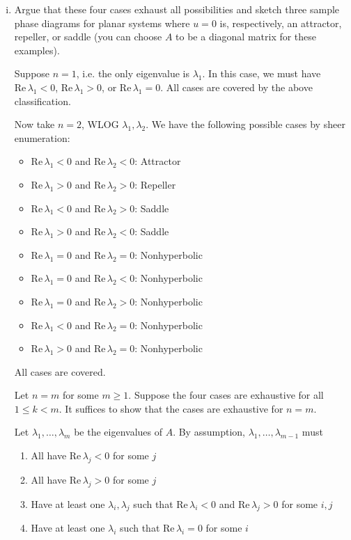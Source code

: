 \documentclass[12pt]{article}
\renewcommand{\Re}{\text{Re}\,}
\begin{document}
\begin{enumerate}[(i)]
    \item Argue that these four cases exhaust all possibilities and sketch three sample phase diagrams for planar systems where $u=0$ is, respectively, an attractor, repeller, or saddle (you can choose $A$ to be a diagonal matrix for these examples).

          \color{blue}
          Suppose $n =1$, i.e. the only eigenvalue is $\lambda_1$. In this case, we must have $\Re\lambda_1 < 0$, $\Re \lambda_1 > 0$, or $\Re \lambda_1 = 0$. All cases are covered by the above classification.

          Now take $n=2$, WLOG $\lambda_1, \lambda_2$. We have the following possible cases by sheer enumeration:
          \begin{itemize}
              \item $\Re \lambda_1 < 0$ and $\Re \lambda_2 < 0$: Attractor
              \item $\Re \lambda_1 > 0$ and $\Re \lambda_2 > 0$: Repeller
              \item $\Re \lambda_1 < 0$ and $\Re \lambda_2 > 0$: Saddle
              \item $\Re \lambda_1 > 0$ and $\Re \lambda_2 < 0$: Saddle
              \item $\Re \lambda_1 = 0$ and $\Re \lambda_2 = 0$: Nonhyperbolic
              \item $\Re \lambda_1 = 0$ and $\Re \lambda_2 < 0$: Nonhyperbolic
              \item $\Re \lambda_1 = 0$ and $\Re \lambda_2 > 0$: Nonhyperbolic
              \item $\Re \lambda_1 < 0$ and $\Re \lambda_2 = 0$: Nonhyperbolic
              \item $\Re \lambda_1 > 0$ and $\Re \lambda_2 = 0$: Nonhyperbolic
          \end{itemize}

          All cases are covered.

          Let $n = m$ for some $m \geq 1$. Suppose the four cases are exhaustive for all $1 \leq k < m$. It suffices to show that the cases are exhaustive for $n = m$.

          Let $\lambda_1, \ldots, \lambda_m$ be the eigenvalues of $A$. By assumption, $\lambda_1, \ldots, \lambda_{m-1}$ must
          \begin{enumerate}
              \item All have $\Re \lambda_j < 0$ for some $j$
              \item All have $\Re \lambda_j > 0$ for some $j$
              \item Have at least one $\lambda_i, \lambda_j$ such that $\Re \lambda_i < 0$ and $\Re \lambda_j > 0$ for some $i, j$
              \item Have at least one $\lambda_i$ such that $\Re \lambda_i = 0$ for some $i$
          \end{enumerate}


\end{enumerate}
\end{document}
